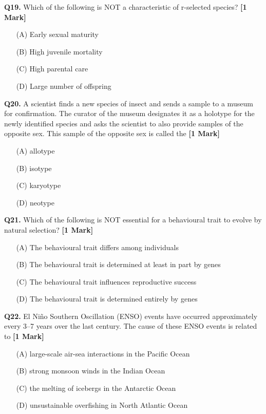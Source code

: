 \documentclass[11pt]{article}
\newcommand{\questiona}[2]{
    \noindent\textbf{Q#2.} #1 \hfill \textbf{[1 Mark]}
}
\begin{document}
\questiona{Which of the following is NOT a characteristic of r-selected species?}{19}
\begin{enumerate}
    \item[(A)] Early sexual maturity
    \item[(B)] High juvenile mortality
    \item[(C)] High parental care
    \item[(D)] Large number of offspring
\end{enumerate}
\vspace{0.5cm}

\questiona{A scientist finds a new species of insect and sends a sample to a museum for confirmation. The curator of the museum designates it as a holotype for the newly identified species and asks the scientist to also provide samples of the opposite sex. This sample of the opposite sex is called the}{20}
\begin{enumerate}
    \item[(A)] allotype
    \item[(B)] isotype
    \item[(C)] karyotype
    \item[(D)] neotype
\end{enumerate}
\vspace{0.5cm}

\questiona{Which of the following is NOT essential for a behavioural trait to evolve by natural selection?}{21}
\begin{enumerate}
    \item[(A)] The behavioural trait differs among individuals
    \item[(B)] The behavioural trait is determined at least in part by genes
    \item[(C)] The behavioural trait influences reproductive success
    \item[(D)] The behavioural trait is determined entirely by genes
\end{enumerate}
\vspace{0.5cm}

\questiona{El Niño Southern Oscillation (ENSO) events have occurred approximately every 3–7 years over the last century. The cause of these ENSO events is related to}{22}
\begin{enumerate}
    \item[(A)] large-scale air-sea interactions in the Pacific Ocean
    \item[(B)] strong monsoon winds in the Indian Ocean
    \item[(C)] the melting of icebergs in the Antarctic Ocean
    \item[(D)] unsustainable overfishing in North Atlantic Ocean
\end{enumerate}
\vspace{0.5cm}
\end{document}
